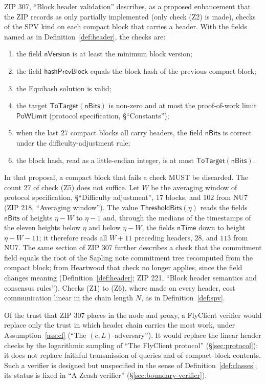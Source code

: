 \documentclass[11pt,a4paper]{article}
\theoremstyle{definition}
\begin{document}
ZIP 307, ``Block header validation'' describes, as a proposed enhancement
that the ZIP records as only partially implemented (only check (Z2) is
made), checks of the SPV kind on each compact block that carries a header. With
the fields named as in
Definition~\ref{def:header}, the checks are:
\begin{enumerate}[label=(Z\arabic*)]
\item the field $\mathsf{nVersion}$ is at least the minimum block version;
\item the field $\mathsf{hashPrevBlock}$ equals the block hash of the
  previous compact block;
\item the Equihash solution is valid;
\item the target $\mathsf{ToTarget}(\mathsf{nBits})$ is non-zero and at most
  the proof-of-work limit $\mathsf{PoWLimit}$ (protocol specification,
  \S``Constants'');
\item when the last $27$ compact blocks all carry headers, the field
  $\mathsf{nBits}$ is correct under the difficulty-adjustment rule;
\item the block hash, read as a little-endian integer, is at most
  $\mathsf{ToTarget}(\mathsf{nBits})$.
\end{enumerate}
In that proposal, a compact block that fails a check MUST be discarded. The
count $27$ of check (Z5) does not suffice. Let $W$ be the averaging window of
protocol specification, \S``Difficulty adjustment'', $17$ blocks, and $102$ from
NU7 (ZIP 218, ``Averaging window''). The value $\mathsf{ThresholdBits}(\eta)$
reads the fields $\mathsf{nBits}$ of heights $\eta - W$ to $\eta - 1$ and,
through the medians of the timestamps of the eleven heights below $\eta$ and
below $\eta - W$, the fields $\mathsf{nTime}$ down to height $\eta - W - 11$; it
therefore reads all $W + 11$ preceding headers, $28$, and $113$ from NU7. The
same section of ZIP 307 further describes a check that the commitment field
equals the root of the Sapling note commitment tree recomputed from the compact
block; from Heartwood that check no longer applies, since the field changes
meaning (Definition~\ref{def:header}; ZIP 221, ``Block header semantics and
consensus rules''). Checks (Z1) to (Z6), where made on every header, cost
communication linear in the chain length $N$, as in Definition~\ref{def:spv}.

Of the trust that ZIP 307 places in the node and proxy, a FlyClient verifier
would replace only the trust in which header chain carries the most work,
under Assumption~\ref{ass:cl} (``The $(c, L)$-adversary''). It would replace
the linear header checks by the logarithmic sampling of ``The FlyClient
protocol'' (\S\ref{sec:protocol}); it does not replace faithful transmission
of queries and of compact-block contents. Such a verifier is designed but
unspecified in the sense of Definition~\ref{def:classes}; its status is
fixed in ``A Zcash verifier'' (\S\ref{sec:boundary-verifier}).
\end{document}
